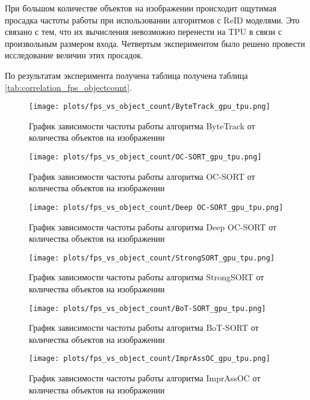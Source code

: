 При большом количестве объектов на изображении происходит ощутимая просадка частоты работы при использовании алгоритмов с ReID моделями. 
Это связано с тем, что их вычисления невозможно перенести на TPU в связи с произвольным размером входа.  
Четвертым экспериментом было решено провести исследование величин этих просадок. 

По результатам эксперимента получена таблица получена таблица \ref{tab:correlation_fps_objectcount}. 


\begin{figure}[ht]
    \centering
    \texttt{[image: plots/fps\_vs\_object\_count/ByteTrack\_gpu\_tpu.png]}
    \caption{График зависимости частоты работы алгоритма ByteTrack от количества объектов на изображении}
    \label{fig:fps_object_ByteTrack}
\end{figure}

\begin{figure}[ht]
    \centering
    \texttt{[image: plots/fps\_vs\_object\_count/OC-SORT\_gpu\_tpu.png]}
    \caption{График зависимости частоты работы алгоритма OC-SORT от количества объектов на изображении}
    \label{fig:fps_object_OC-SORT}
\end{figure}

\begin{figure}[ht]
    \centering
    \texttt{[image: plots/fps\_vs\_object\_count/Deep OC-SORT\_gpu\_tpu.png]}
    \caption{График зависимости частоты работы алгоритма Deep OC-SORT от количества объектов на изображении}
    \label{fig:fps_object_Deep OC-SORT}
\end{figure}

\begin{figure}[ht]
    \centering
    \texttt{[image: plots/fps\_vs\_object\_count/StrongSORT\_gpu\_tpu.png]}
    \caption{График зависимости частоты работы алгоритма StrongSORT от количества объектов на изображении}
    \label{fig:fps_object_StrongSORT}
\end{figure}

\begin{figure}[ht]
    \centering
    \texttt{[image: plots/fps\_vs\_object\_count/BoT-SORT\_gpu\_tpu.png]}
    \caption{График зависимости частоты работы алгоритма BoT-SORT от количества объектов на изображении}
    \label{fig:fps_object_BoT-SORT}
\end{figure}

\begin{figure}[ht]
    \centering
    \texttt{[image: plots/fps\_vs\_object\_count/ImprAssOC\_gpu\_tpu.png]}
    \caption{График зависимости частоты работы алгоритма ImprAssOC от количества объектов на изображении}
    \label{fig:fps_object_ImprAssOC}
\end{figure}
\FloatBarrier